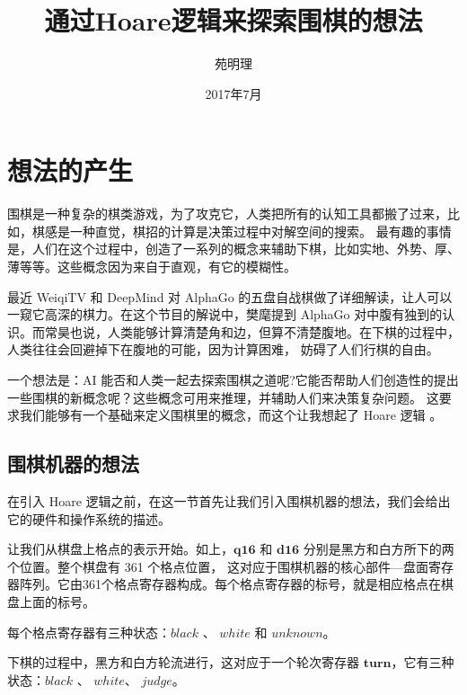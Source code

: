 \documentclass[a4paper,10.5pt]{article}
\title{通过Hoare逻辑来探索围棋的想法}
\author{苑明理}
\date{2017年7月}
\begin{document}
\maketitle{}
\renewcommand\contentsname{目录}
\setcounter{tocdepth}{2}
\tableofcontents

\newpage

\section{想法的产生}

围棋是一种复杂的棋类游戏，为了攻克它，人类把所有的认知工具都搬了过来，比如，棋感是一种直觉，棋招的计算是决策过程中对解空间的搜索。
最有趣的事情是，人们在这个过程中，创造了一系列的概念来辅助下棋，比如实地、外势、厚、薄等等。这些概念因为来自于直观，有它的模糊性。

最近 WeiqiTV 和 DeepMind 对 AlphaGo 的五盘自战棋做了详细解读，让人可以一窥它高深的棋力。在这个节目的解说中，樊麾提到 AlphaGo
对中腹有独到的认识。而常昊也说，人类能够计算清楚角和边，但算不清楚腹地。在下棋的过程中，人类往往会回避掉下在腹地的可能，因为计算困难，
妨碍了人们行棋的自由。

一个想法是：AI 能否和人类一起去探索围棋之道呢?它能否帮助人们创造性的提出一些围棋的新概念呢？这些概念可用来推理，并辅助人们来决策复杂问题。
这要求我们能够有一个基础来定义围棋里的概念，而这个让我想起了 Hoare 逻辑 。

\subsection{围棋机器的想法}

在引入 Hoare 逻辑之前，在这一节首先让我们引入围棋机器的想法，我们会给出它的硬件和操作系统的描述。

\setcounter{gomove}{-1}
\begin{center}
\begin{psgoboard}
\end{psgoboard}
\end{center}

让我们从棋盘上格点的表示开始。如上，$\mathbf{q16}$ 和 $\mathbf{d16}$ 分别是黑方和白方所下的两个位置。整个棋盘有 361 个格点位置，
这对应于围棋机器的核心部件—盘面寄存器阵列。它由361个格点寄存器构成。每个格点寄存器的标号，就是相应格点在棋盘上面的标号。

每个格点寄存器有三种状态：$\mathit{black}$ 、 $\mathit{white}$ 和 $\mathit{unknown}$。

下棋的过程中，黑方和白方轮流进行，这对应于一个轮次寄存器 $\mathbf{turn}$，它有三种状态：$\mathit{black}$ 、 $\mathit{white}$、 $\mathit{judge}$。
\end{document}
